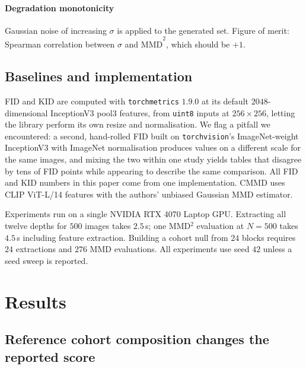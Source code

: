 \documentclass[preprint,12pt,authoryear]{elsarticle}
\newcommand{\mmd}{\mathrm{MMD}}
\begin{document}
\paragraph{Degradation monotonicity}
Gaussian noise of increasing $\sigma$ is applied to the generated set. Figure of
merit: Spearman correlation between $\sigma$ and $\widehat{\mmd}^2$, which
should be $+1$.

\subsection{Baselines and implementation}
\label{sec:baselines}

FID and KID are computed with \texttt{torchmetrics} $1.9.0$ at its default
$2048$-dimensional InceptionV3 pool3 features, from \texttt{uint8} inputs at
$256\times256$, letting the library perform its own resize and normalisation.
We flag a pitfall we encountered: a second, hand-rolled FID built on
\texttt{torchvision}'s ImageNet-weight InceptionV3 with ImageNet normalisation
produces values on a different scale for the same images, and mixing the two
within one study yields tables that disagree by tens of FID points while
appearing to describe the same comparison. All FID and KID numbers in this paper
come from one implementation. CMMD \citep{jayasumana2024cmmd} uses CLIP
ViT-L/14 features with the authors' unbiased Gaussian MMD estimator.

Experiments run on a single NVIDIA RTX 4070 Laptop GPU. Extracting all twelve
depths for $500$ images takes $2.5$\,s; one MMD$^2$ evaluation at $N=500$ takes
$4.5$\,s including feature extraction. Building a cohort null from $24$ blocks
requires $24$ extractions and $276$ MMD evaluations. All experiments use seed
$42$ unless a seed sweep is reported.

\section{Results}
\label{sec:results}

\subsection{Reference cohort composition changes the reported score}
\label{sec:res_cohort}
\end{document}
